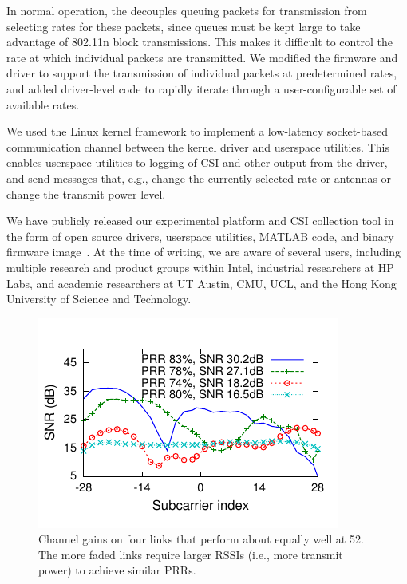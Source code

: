  In normal operation, the  decouples queuing packets for transmission from selecting rates for these packets, since queues must be kept large to take advantage of 802.11n block transmissions. This makes it difficult to control the rate at which individual packets are transmitted. We modified the firmware and driver to support the transmission of individual packets at predetermined rates, and added driver-level code to rapidly iterate through a user-configurable set of available rates.

 We used the Linux kernel  framework to implement a low-latency socket-based communication channel between the kernel driver and userspace utilities. This enables userspace utilities to logging of CSI and other output from the driver, and send messages that, e.g., change the currently selected rate or antennas or change the transmit power level.

 We have publicly released our experimental platform and CSI collection tool in the form of open source drivers, userspace utilities, MATLAB code, and binary firmware image~\cite{Halperin_csitool}. At the time of writing, we are aware of several users, including multiple research and product groups within Intel, industrial researchers at HP Labs, and academic researchers at UT Austin, CMU, UCL, and the Hong Kong University of Science and Technology.

\begin{figure}[t]
  \centering
  \includegraphics[width=\columnwidth,viewport=2 9 185 108,clip]{figures/esnr/embed_fsf-shape-two-links.pdf}
  \caption{Channel gains on four links that perform about equally well at 52\Mbps. The more faded links require larger RSSIs (i.e., more transmit power) to achieve similar PRRs.}
  \label{fig:example_fsf_shape}

\end{figure}

